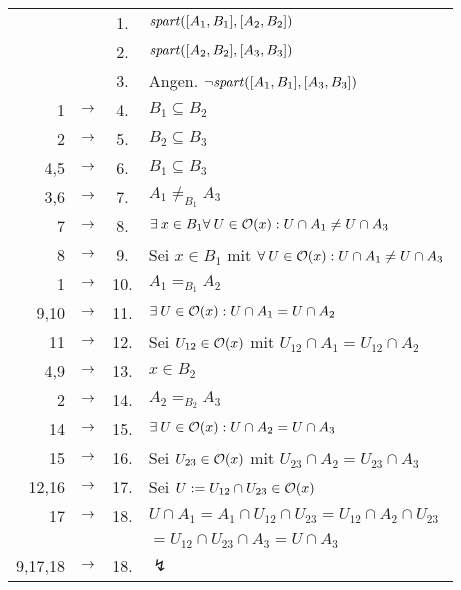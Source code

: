 \begin{longtable}{r c c l}
    & & 1. & $\mathit{spart}([A_1,B_1],[A_2,B_2])$ \\
    & & 2. & $\mathit{spart}([A_2,B_2],[A_3,B_3])$ \\
    & & 3. & Angen. $\neg \mathit{spart}([A_1,B_1],[A_3,B_3])$ \\
    1 & $\rightarrow$ & 4. & $B_1 \subseteq B_2$ \\
    2 & $\rightarrow$ & 5. & $B_2 \subseteq B_3$ \\
    4,5 & $\rightarrow$ & 6. & $B_1 \subseteq B_3$ \\
    3,6 & $\rightarrow$ & 7. & $A_1 \neq_{B_1} A_3$ \\
    7 & $\rightarrow$ & 8. & $\exists\: x \in B_1 \forall\: U \in \mathcal{O}(x): U \cap A_1 \neq U \cap A_3$\\
    8 & $\rightarrow$ & 9. & Sei $x \in B_1$ mit $\forall\: U \in \mathcal{O}(x): U \cap A_1 \neq U \cap A_3$ \\
    1 & $\rightarrow$ & 10. & $A_1 =_{B_1} A_2$ \\
    9,10 & $\rightarrow$ & 11. & $\exists\: U \in \mathcal{O}(x): U \cap A_1 = U \cap A_2$ \\
    11 & $\rightarrow$ & 12. & Sei $U_{12} \in \mathcal{O}(x)$ mit $U_{12} \cap A_1 = U_{12} \cap A_2$  \\
    4,9 & $\rightarrow$ & 13. & $x \in B_2$ \\
    2 & $\rightarrow$ & 14. & $A_2 =_{B_2} A_3$ \\
    14 & $\rightarrow$ & 15. & $\exists\: U \in \mathcal{O}(x): U \cap A_2 = U \cap A_3$ \\
    15 & $\rightarrow$ & 16. & Sei $U_{23} \in \mathcal{O}(x)$ mit $U_{23} \cap A_2 = U_{23} \cap A_3$ \\
    12,16 & $\rightarrow$ & 17. & Sei $U := U_{12} \cap U_{23} \in \mathcal{O}(x)$ \\
    17 & $\rightarrow$ & 18. & $U \cap A_1 = A_1 \cap U_{12} \cap U_{23} = U_{12} \cap A_2 \cap U_{23}$\\ 
                        &&& $= U_{12} \cap U_{23} \cap A_3 = U \cap A_3$ \\
    9,17,18 & $\rightarrow$ & 18. & $\lightning$
\end{longtable}	


